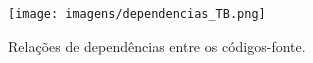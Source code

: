 \begin{figure}[h!tbp]
\centering
  \texttt{[image: imagens/dependencias\_TB.png]}
\caption{Relações de dependências entre os códigos-fonte.}
\label{fig:dependencias}
\end{figure}